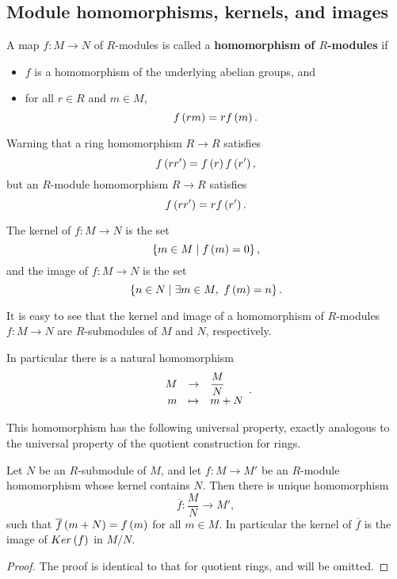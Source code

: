 \subsection{Module homomorphisms, kernels, and images}

\begin{definition}
A map $ f : M \to N $ of $ R $-modules is called a \textbf{homomorphism of $ R $-modules} if
\begin{itemize}
\item $ f $ is a homomorphism of the underlying abelian groups, and
\item for all $ r \in R $ and $ m \in M $,
$$ f\left( rm \right) = rf\left( m \right). $$
\end{itemize}
\end{definition}

Warning that a ring homomorphism $ R \to R $ satisfies
$$ f\left( rr' \right) = f\left( r \right)f\left( r' \right), $$
but an $ R $-module homomorphism $ R \to R $ satisfies
$$ f\left( rr' \right) = rf\left( r' \right). $$

\begin{definition}
The kernel of $ f : M \to N $ is the set
$$ \left\{ m \in M \mid f\left( m \right) = 0 \right\}, $$
and the image of $ f : M \to N $ is the set
$$ \left\{ n \in N \mid \exists m \in M, \ f\left( m \right) = n \right\}. $$
\end{definition}

It is easy to see that the kernel and image of a homomorphism of $ R $-modules $ f : M \to N $ are $ R $-submodules of $ M $ and $ N $, respectively.

\begin{note*}
In particular there is a natural homomorphism
$$ \function{M}{\dfrac{M}{N}}{m}{m + N}. $$
\end{note*}

This homomorphism has the following universal property, exactly analogous to the universal property of the quotient construction for rings.

\begin{proposition}
Let $ N $ be an $ R $-submodule of $ M $, and let $ f : M \to M' $ be an $ R $-module homomorphism whose kernel contains $ N $. Then there is unique homomorphism
$$ \overline{f} : \dfrac{M}{N} \to M', $$
such that $ \overline{f}\left( m + N \right) = f\left( m \right) $ for all $ m \in M $. In particular the kernel of $ \overline{f} $ is the image of $ Ker\left( f \right) $ in $ M / N $.
\end{proposition}

\begin{proof}
The proof is identical to that for quotient rings, and will be omitted.
\end{proof}

